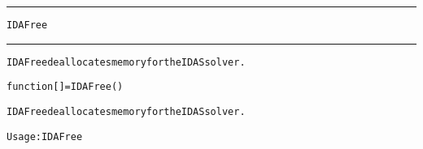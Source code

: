 \begin{samepage}
\hrule
\begin{center}
{\large \verb!IDAFree!}
\label{p:IDAFree}
\end{center}
\hrule\vspace{0.1in}



\begin{alltt}
IDAFree deallocates memory for the IDAS solver.
\end{alltt}

\end{samepage}



\begin{samepage}


\begin{alltt}
function [] = IDAFree() 
\end{alltt}

\end{samepage}



\begin{alltt}
IDAFree deallocates memory for the IDAS solver.

   Usage:  IDAFree
\end{alltt}






\vspace{0.1in}